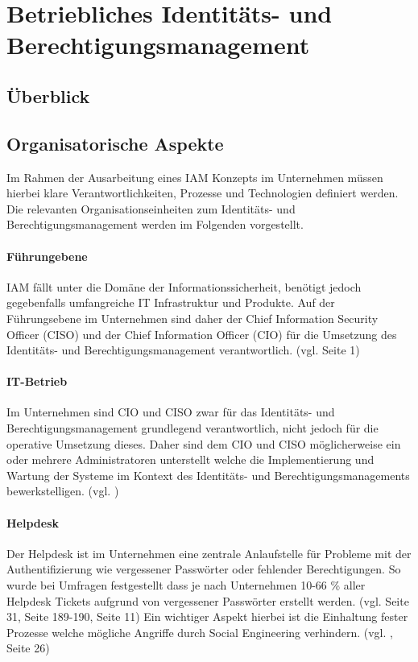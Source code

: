 \documentclass[11pt]{article}
\begin{document}
\section{Betriebliches Identitäts- und Berechtigungsmanagement}
\label{sec:betrieb}
\subsection{Überblick}
\subsection{Organisatorische Aspekte}
Im Rahmen der Ausarbeitung eines IAM Konzepts im Unternehmen müssen hierbei klare Verantwortlichkeiten, Prozesse und Technologien definiert werden. Die relevanten Organisationseinheiten zum Identitäts- und Berechtigungsmanagement werden im Folgenden vorgestellt.
\paragraph{Führungebene}
IAM fällt unter die Domäne der Informationssicherheit, benötigt jedoch gegebenfalls umfangreiche IT Infrastruktur und Produkte. Auf der Führungsebene im Unternehmen sind daher der Chief Information Security Officer (CISO) und der Chief Information Officer (CIO) für die Umsetzung des Identitäts- und Berechtigungsmanagement verantwortlich. (vgl. \cite{mont2010economics} Seite 1)
\paragraph{IT-Betrieb}
Im Unternehmen sind CIO und CISO zwar für das Identitäts- und Berechtigungsmanagement grundlegend verantwortlich, nicht jedoch für die operative Umsetzung dieses. Daher sind dem CIO und CISO möglicherweise ein oder mehrere Administratoren unterstellt welche die Implementierung und Wartung der Systeme im Kontext des Identitäts- und Berechtigungsmanagements bewerkstelligen. (vgl. \cite{microsoft2024iamadmin})
\paragraph{Helpdesk}
Der Helpdesk ist im Unternehmen eine zentrale Anlaufstelle für Probleme mit der Authentifizierung wie vergessener Passwörter oder fehlender Berechtigungen. So wurde bei Umfragen festgestellt dass je nach Unternehmen 10-66 \% aller Helpdesk Tickets aufgrund von vergessener Passwörter erstellt werden. (vgl. \cite{ylen2004centralized} Seite 31, \cite{tsolkas2017} Seite 189-190, \cite{hummer2016adaptive} Seite 11) Ein wichtiger Aspekt hierbei ist die Einhaltung fester Prozesse welche mögliche Angriffe durch Social Engineering verhindern. (vgl. \cite{wood2005implementing}, \cite{ylen2004centralized} Seite 26)
\end{document}
